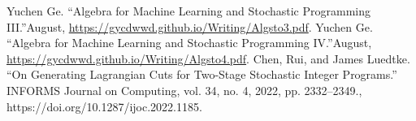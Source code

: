 \documentclass{article}
\theoremstyle{plain}
\theoremstyle{definition}
\begin{document}
\begin{thebibliography}{99}
Yuchen Ge. “Algebra for Machine Learning and Stochastic Programming III.”August, \href{https://gycdwwd.github.io/Writing/Algsto3.pdf}{https://gycdwwd.github.io/Writing/Algsto3.pdf}.  
Yuchen Ge. “Algebra for Machine Learning and Stochastic Programming IV.”August, \href{https://gycdwwd.github.io/Writing/Algsto4.pdf}{https://gycdwwd.github.io/Writing/Algsto4.pdf}.  
 Chen, Rui, and James Luedtke. “On Generating Lagrangian Cuts for Two-Stage Stochastic Integer Programs.” INFORMS Journal on Computing, vol. 34, no. 4, 2022, pp. 2332–2349., https://doi.org/10.1287/ijoc.2022.1185. 
\end{thebibliography}
\end{document}
